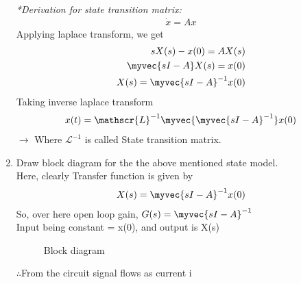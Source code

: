\begin{enumerate}[label=\thesubsection.\arabic*.,ref=\thesubsection.\theenumi]
\emph{*Derivation for state transition matrix:}
\begin{align}
    \dot{x} =Ax
\end{align} 
Applying laplace transform, we get
\begin{align}
    sX(s) -x(0) = AX(s)\\
    \myvec{sI - A}X(s) = x(0)\\
    X(s) = \myvec{sI - A}^{-1}x(0)\\
\end{align} 
Taking inverse laplace transform
\begin{align}
    x(t) = \mathscr{L}^{-1}\myvec{\myvec{sI -A}^{-1}}x(0)
\end{align}
$\to$ Where $\mathscr{L}^{-1}$ is called State transition matrix.\\
\item Draw block diagram for the the above mentioned state model.\\
\solution Here, clearly Transfer function is given by 
\begin{align}
    X(s) = \myvec{sI - A}^{-1}x(0)
\end{align}
So, over here open loop gain, $G(s) = \myvec{sI - A}^{-1}$\\
Input being constant = x(0), and output is X(s)\\
\newline
\begin{figure}[!ht]
    \begin{center}
		
		\resizebox{\columnwidth}{!}{}
	\end{center}
\caption{Block diagram}
\label{fig:block}
\end{figure}
$\therefore$From the circuit signal flows as current i
\end{enumerate}
